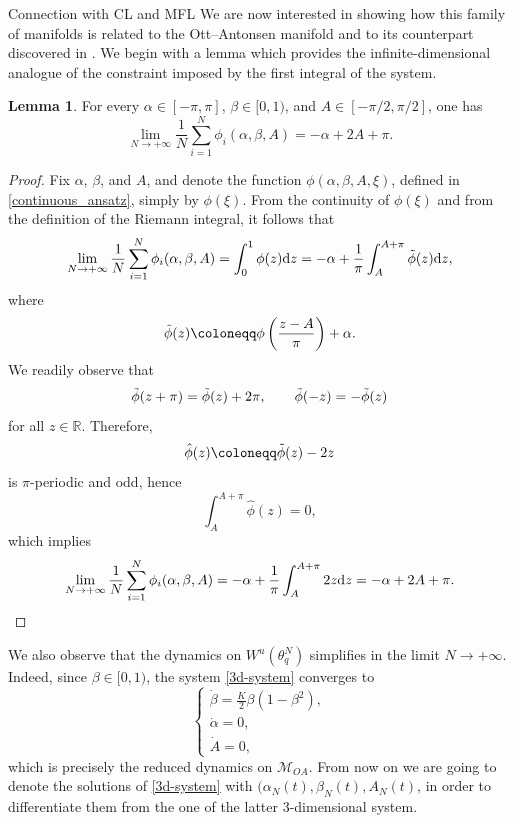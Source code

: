 \documentclass{article}
\theoremstyle{definition}
\newtheorem{lemma}[definition]{Lemma}
\newcommand{\R}{\mathbb{R}}
\renewcommand{\d}{\textnormal{d}}
\begin{document}
\begin{section}{Connection with CL and MFL}\label{conn_sec}
We are now interested in showing how this family of manifolds is related to the Ott--Antonsen manifold and to its counterpart discovered in \cite{kuehn2025mean}. We begin with a lemma which provides the infinite-dimensional analogue of the constraint imposed by the first integral of the system.

\begin{lemma}\label{inf_constrain}
    For every $\alpha\in[-\pi,\pi]$, $\beta\in[0,1)$, and $A\in[-\pi/2,\pi/2]$, one has
    $$\lim_{N\rightarrow+\infty}\frac{1}{N}\sum_{i=1}^N\phi_i(\alpha,\beta,A)=-\alpha+2A+\pi.$$
\end{lemma}

\begin{proof}
    Fix $\alpha$, $\beta$, and $A$, and denote the function $\phi(\alpha,\beta,A,\xi)$, defined in \eqref{continuous_ansatz}, simply by $\phi(\xi)$.
     From the continuity of $\phi(\xi)$ and from the definition of the Riemann integral, it follows that
    $$\lim_{N\rightarrow+\infty}\frac{1}{N}\sum_{i=1}^N\phi_i(\alpha,\beta,A)=\int_0^1\phi(z)\d z=-\alpha+\frac{1}{\pi}\int_A^{A+\pi}\Tilde{\phi}(z)\d z,$$
    where
    $$\Tilde{\phi}(z)\coloneqq\phi\left(\frac{z-A}{\pi}\right)+\alpha.$$
    We readily observe that
    $$\Tilde{\phi}(z+\pi)=\Tilde{\phi}(z)+2\pi,\qquad\Tilde{\phi}(-z)=-\Tilde{\phi}(z)$$
    for all $z\in\R$. Therefore,
    $$\hat{\phi}(z)\coloneqq\Tilde{\phi}(z)-2z$$
    is $\pi$-periodic and odd, hence
    $$\int_{A}^{A+\pi}\hat{\phi}(z)=0,$$
    which implies
    $$\lim_{N\rightarrow+\infty}\frac{1}{N}\sum_{i=1}^N\phi_i(\alpha,\beta,A)=-\alpha+\frac{1}{\pi}\int_A^{A+\pi}2z\d z=-\alpha+2A+\pi.\qedhere$$
\end{proof}
We also observe that the dynamics on $W^u(\theta^N_q)$ simplifies in the limit $N\rightarrow+\infty$. Indeed, since $\beta\in[0,1)$, the system \eqref{3d-system} converges to
\begin{equation}\label{limit_dyn}
    \begin{cases}
    \dot{\beta}=\frac{K}{2}\beta(1-\beta^2),\\
    \dot{\alpha}=0,\\
    \dot{A}=0,
\end{cases}
\end{equation}
which is precisely the reduced dynamics on $\mathcal{M}_{OA}$. From now on we are going to denote the solutions of \eqref{3d-system} with $(\alpha_N(t),\beta_N(t),A_N(t)$, in order to differentiate them from the one of the latter 3-dimensional system.\\


\end{section}
\end{document}
